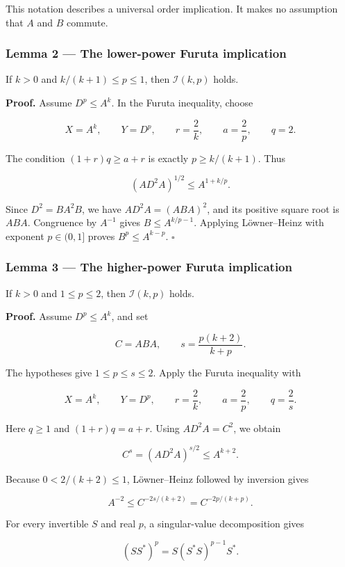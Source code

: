 \documentclass[10pt,a4paper]{article}
\begin{document}
This notation describes a universal order implication. It makes no
assumption that \(A\) and \(B\) commute.

\subsubsection{Lemma 2 --- The lower-power Furuta
implication}\label{lemma-2-the-lower-power-furuta-implication}

If \(k>0\) and \(k/(k+1)\le p\le1\), then \(\mathcal I(k,p)\) holds.

\textbf{Proof.} Assume \(D^p\le A^k\). In the Furuta inequality, choose

\[
X=A^k,\qquad Y=D^p,\qquad r=\frac2k,\qquad
a=\frac2p,\qquad q=2.
\]

The condition \((1+r)q\ge a+r\) is exactly \(p\ge k/(k+1)\). Thus

\[
(AD^2A)^{1/2}\le A^{1+k/p}.
\]

Since \(D^2=BA^2B\), we have \(AD^2A=(ABA)^2\), and its positive square
root is \(ABA\). Congruence by \(A^{-1}\) gives \(B\le A^{k/p-1}\).
Applying Löwner--Heinz with exponent \(p\in(0,1]\) proves
\(B^p\le A^{k-p}\). \(\square\)

\subsubsection{Lemma 3 --- The higher-power Furuta
implication}\label{lemma-3-the-higher-power-furuta-implication}

If \(k>0\) and \(1\le p\le2\), then \(\mathcal I(k,p)\) holds.

\textbf{Proof.} Assume \(D^p\le A^k\), and set

\[
C=ABA,\qquad s=\frac{p(k+2)}{k+p}.
\]

The hypotheses give \(1\le p\le s\le2\). Apply the Furuta inequality
with

\[
X=A^k,\qquad Y=D^p,\qquad r=\frac2k,\qquad
a=\frac2p,\qquad q=\frac2s.
\]

Here \(q\ge1\) and \((1+r)q=a+r\). Using \(AD^2A=C^2\), we obtain

\[
C^s=(AD^2A)^{s/2}\le A^{k+2}.
\]

Because \(0<2/(k+2)\le1\), Löwner--Heinz followed by inversion gives

\[
A^{-2}\le C^{-2s/(k+2)}=C^{-2p/(k+p)}.
\]

For every invertible \(S\) and real \(p\), a singular-value
decomposition gives

\[
(SS^*)^p=S(S^*S)^{p-1}S^*.
\]
\end{document}
